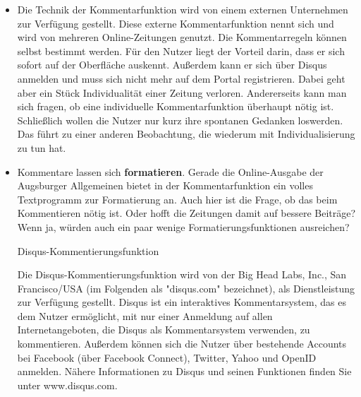 \begin{itemize}
\item Die Technik der Kommentarfunktion wird von einem externen Unternehmen zur Verfügung gestellt. Diese externe 
Kommentarfunktion nennt sich \grqq\- und wird von mehreren Online-Zeitungen genutzt. Die Kommentarregeln können selbst bestimmt werden. Für den Nutzer liegt der Vorteil darin, dass er sich sofort auf der Oberfläche auskennt. Außerdem kann er sich über Disqus anmelden und muss sich nicht mehr auf dem Portal registrieren. Dabei geht aber ein Stück Individualität einer Zeitung verloren. Andererseits kann man sich fragen, ob eine individuelle Kommentarfunktion überhaupt nötig ist. Schließlich wollen die Nutzer nur kurz ihre spontanen Gedanken loswerden. Das führt zu einer anderen Beobachtung, die wiederum mit Individualisierung zu tun hat. 
\item Kommentare lassen sich {\bfseries formatieren}. Gerade die Online-Ausgabe der Augsburger Allgemeinen bietet in der Kommentarfunktion ein volles Textprogramm zur Formatierung an.  Auch hier ist die Frage, ob das beim Kommentieren nötig ist. Oder hofft die Zeitungen damit auf bessere Beiträge? Wenn ja, würden auch ein paar wenige Formatierungsfunktionen ausreichen? 

Disqus-Kommentierungsfunktion

Die Disqus-Kommentierungsfunktion wird von der Big Head Labs, Inc., San Francisco/USA (im Folgenden als "disqus.com" bezeichnet), als Dienstleistung zur Verfügung gestellt. Disqus ist ein interaktives Kommentarsystem, das es dem Nutzer ermöglicht, mit nur einer Anmeldung auf allen Internetangeboten, die Disqus als Kommentarsystem verwenden, zu kommentieren. Außerdem können sich die Nutzer über bestehende Accounts bei Facebook (über Facebook Connect), Twitter, Yahoo und OpenID anmelden. Nähere Informationen zu Disqus und seinen Funktionen finden Sie unter www.disqus.com.




\end{itemize}
